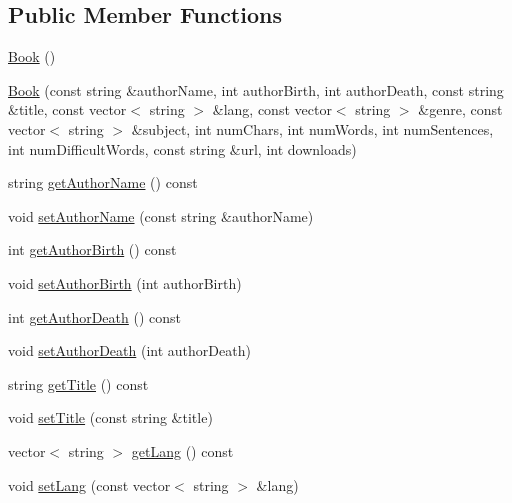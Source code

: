\subsection*{Public Member Functions}
\begin{DoxyCompactItemize}
\item 
\mbox{\hyperlink{classbridges_1_1dataset_1_1_book_a951e7d455f2fd89aa05224cbf362e244}{Book}} ()
\item 
\mbox{\hyperlink{classbridges_1_1dataset_1_1_book_a4770a401c2634cb9124c34e462721338}{Book}} (const string \&author\+Name, int author\+Birth, int author\+Death, const string \&title, const vector$<$ string $>$ \&lang, const vector$<$ string $>$ \&genre, const vector$<$ string $>$ \&subject, int num\+Chars, int num\+Words, int num\+Sentences, int num\+Difficult\+Words, const string \&url, int downloads)
\item 
string \mbox{\hyperlink{classbridges_1_1dataset_1_1_book_ad2a683f09b76c7262c3de0215bf2f40d}{get\+Author\+Name}} () const
\item 
void \mbox{\hyperlink{classbridges_1_1dataset_1_1_book_a6a361133defe82e2405af865514a0065}{set\+Author\+Name}} (const string \&author\+Name)
\item 
int \mbox{\hyperlink{classbridges_1_1dataset_1_1_book_aa7ba093d9bf5ee7d757a0b8ff87e06f0}{get\+Author\+Birth}} () const
\item 
void \mbox{\hyperlink{classbridges_1_1dataset_1_1_book_a04c01f0f2f0778f7f5c6bde3f98e0608}{set\+Author\+Birth}} (int author\+Birth)
\item 
int \mbox{\hyperlink{classbridges_1_1dataset_1_1_book_ac4cfa9060e1d9cedbf2143215065a3ed}{get\+Author\+Death}} () const
\item 
void \mbox{\hyperlink{classbridges_1_1dataset_1_1_book_a318b060a519e1889507a20313683ed89}{set\+Author\+Death}} (int author\+Death)
\item 
string \mbox{\hyperlink{classbridges_1_1dataset_1_1_book_a3c4ca2e8bfa41fb502a5343b586dc73f}{get\+Title}} () const
\item 
void \mbox{\hyperlink{classbridges_1_1dataset_1_1_book_a19015494ad6a1d9c75a5c6af63be0dbf}{set\+Title}} (const string \&title)
\item 
vector$<$ string $>$ \mbox{\hyperlink{classbridges_1_1dataset_1_1_book_ae9df8dfb356a6b84977118a64d2982ad}{get\+Lang}} () const
\item 
void \mbox{\hyperlink{classbridges_1_1dataset_1_1_book_aa3b75d6178efc4ddef9b3255dafba3ab}{set\+Lang}} (const vector$<$ string $>$ \&lang)
\item 

\end{DoxyCompactItemize}
